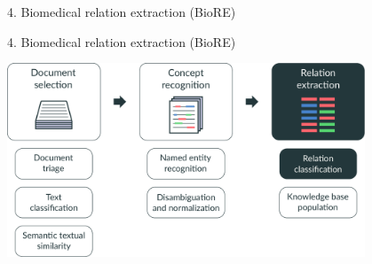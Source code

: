 \renewcommand{\CurrentProgressBarIs}{\FourOfFive}
\begingroup
\begin{frame}[t,plain]{4. Biomedical relation extraction (BioRE)}
\end{frame}
\endgroup
\begingroup
{}
\begin{frame}[t]{4. Biomedical relation extraction (BioRE)}

\centering
\includegraphics[width=0.80\textwidth]{img/biomedical-information-extraction/v3/007.pdf}%

\end{frame}
\endgroup
